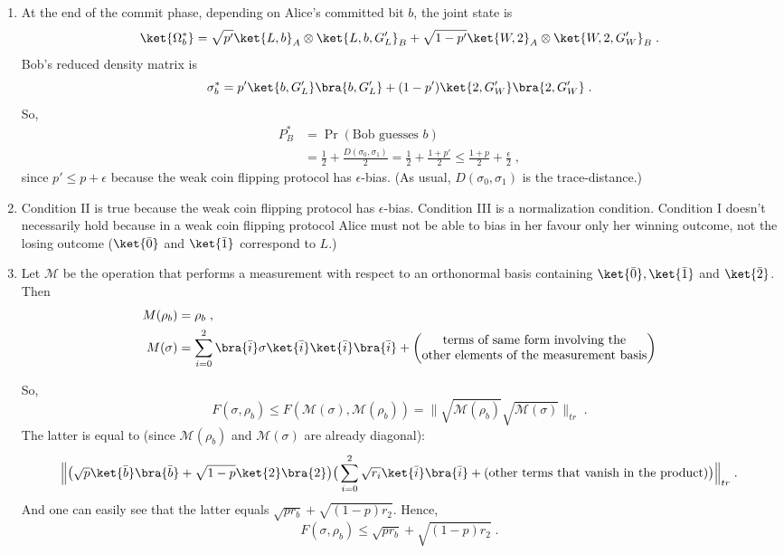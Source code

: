 \begin{exercises}
\begin{enumerate}
\item At the end of the commit phase, depending on Alice's committed bit $b$, the joint state is
\begin{equation*}
\ket{\Omega_b^*} =  \sqrt{p'} \ket{L,b}_A \otimes \ket{ L,b, G'_L}_B + \sqrt{1-p'} \ket{W,2}_A \otimes \ket{ W,2, G'_W}_B\;.
\end{equation*}
Bob's reduced density matrix is
\begin{equation*}
\sigma_b^* = p' \ket{b,G'_L}\bra{b,G'_L} + (1-p')\ket{2,G'_W}\bra{2,G'_W}\;.
\end{equation*}
So,
\begin{align*}
P_B^* &= \Pr(\mbox{Bob guesses $b$})\\
& = \frac12 + \frac{D(\sigma_0,\sigma_1)}{2} = \frac12 + \frac{1+p'}{2} \leq \frac{1+p}{2}+\frac{\epsilon}{2}\;,
\end{align*}
since $p' \leq p+\epsilon$ because the weak coin flipping protocol has $\epsilon$-bias. (As usual, $D(\sigma_0,\sigma_1)$ is the trace-distance.)

\item Condition II is true because the weak coin flipping protocol has $\epsilon$-bias. Condition III is a normalization condition. Condition I doesn't necessarily hold because in a weak coin flipping protocol Alice must not be able to bias in her favour only her winning outcome, not the losing outcome ($\ket{\bar{0}}$ and $\ket{\bar{1}}$ correspond to $L$.)

\item Let $\mathcal{M}$ be the operation that performs a measurement with respect to an orthonormal basis containing $\ket{\bar{0}}, \ket{\bar{1}}$ and $\ket{\bar{2}}$. 
Then
\begin{align*}
	M(\rho_b) &= \rho_b\;, \\
	M(\sigma) &= \sum_{i=0}^2 \bra{\bar{i}}\sigma \ket{\bar{i}}\ket{\bar{i}}\bra{\bar{i}} +
	\begin{pmatrix}
		\mbox{terms of same form involving the}\\
		\mbox{other elements of the measurement basis}\\
	\end{pmatrix}
\end{align*}

So,
\begin{equation*}
F(\sigma, \rho_b) \leq F(\mathcal{M}(\sigma), \mathcal{M}(\rho_b)) = \Big\|\sqrt{\mathcal{M}(\rho_b)} \sqrt{\mathcal{M}(\sigma)} \Big\|_{tr}\;.
\end{equation*}
The latter is equal to (since $\mathcal{M}(\rho_b)$ and $\mathcal{M}(\sigma)$ are already diagonal):
\begin{equation*}
\Big\|\big(\sqrt{p} \ket{\bar{b}}\bra{\bar{b}} + \sqrt{1-p} \ket{2}\bra{2}\big)\big(\sum_{i=0}^2 \sqrt{r_i}\ket{\bar{i}}\bra{\bar{i}} + (\mbox{other terms that vanish in the product}) \big) \Big\|_{tr}\;.
\end{equation*}
And one can easily see that the latter equals $\sqrt{pr_b}+\sqrt{(1-p)r_2}$. 
Hence,
\begin{equation*}
F(\sigma, \rho_b) \leq \sqrt{pr_b}+\sqrt{(1-p)r_2}\;.
\end{equation*}


\end{enumerate}
\end{exercises}

